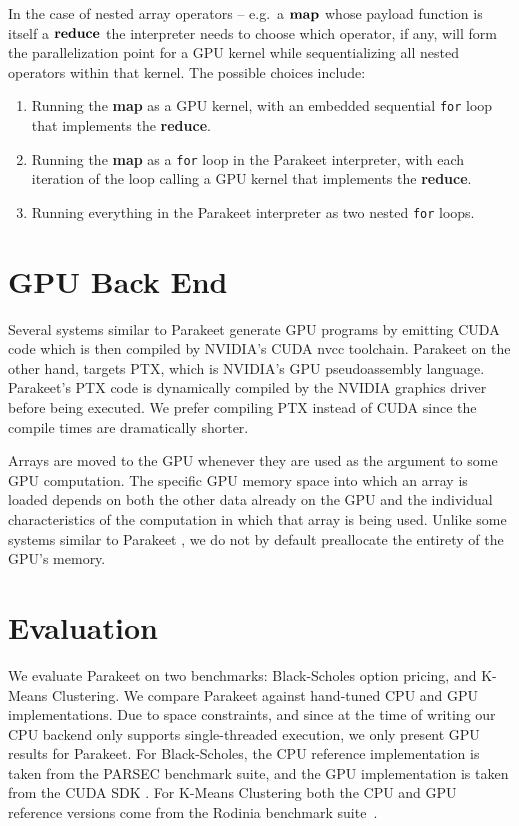 \documentclass[10pt,twocolumn]{article}
\begin{document}
In the case of nested array operators -- e.g.~a $\mbox{\textbf{map}}$ whose payload function is itself a $\mbox{\textbf{reduce}}$ the interpreter needs to choose which operator, if any, will form the parallelization point for a GPU kernel while sequentializing all nested operators within that kernel.  The possible choices include:

\begin{enumerate}
\item Running the \textbf{map} as a GPU kernel, with an embedded sequential \texttt{for} loop that implements the \textbf{reduce}.
\item Running the \textbf{map} as a \texttt{for} loop in the Parakeet interpreter, with each iteration of the loop calling a GPU kernel that implements the \textbf{reduce}.
\item Running everything in the Parakeet interpreter as two nested \texttt{for} loops.
\end{enumerate}



\section{GPU Back End}
Several systems similar to Parakeet \cite{Cata11,Chaf11} generate GPU programs by emitting CUDA code which is then compiled by NVIDIA's CUDA nvcc toolchain. Parakeet on the other hand, targets PTX, which is NVIDIA's GPU pseudoassembly language. Parakeet's PTX code is dynamically compiled by the NVIDIA graphics driver before being executed.  We prefer compiling PTX instead of CUDA since the compile times are dramatically shorter. 

Arrays are moved to the GPU whenever they are used as the argument to some GPU computation. The specific GPU memory space into which an array is loaded depends on both the other data already on the GPU and the individual characteristics of the computation in which that array is being used.
Unlike some systems similar to Parakeet \cite{Chaf11}, we do not by default preallocate the entirety of the GPU's memory. 

\section{Evaluation}
\label{Evaluation}

We evaluate Parakeet on two benchmarks: Black-Scholes option pricing, and K-Means Clustering.  We compare Parakeet against hand-tuned CPU and GPU implementations.  Due to space constraints, and since at the time of writing our CPU backend only supports single-threaded execution, we only present GPU results for Parakeet.  For Black-Scholes, the CPU reference implementation is taken from the PARSEC \cite{Bien08} benchmark suite, and the GPU implementation is taken from the CUDA SDK \cite{NvidSD}.  For K-Means Clustering both the CPU and GPU reference versions come from the Rodinia benchmark suite~\cite{Che09}.
\end{document}
